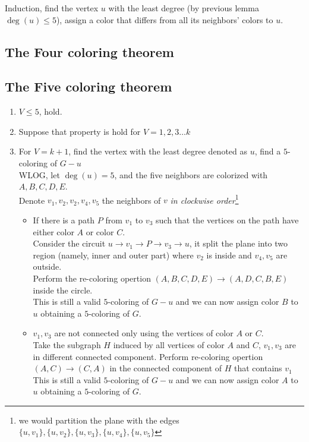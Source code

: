 \documentclass{article}
\begin{document}
Induction, find the vertex $u$ with the least degree (by previous lemma $\deg(u)\leq 5$), assign a color that differs from all its neighbors' colors to $u$.

\subsection{The Four coloring theorem}


\subsection{The Five coloring theorem}

\begin{enumerate}
	\item $V\leq 5$, hold.
	\item Suppose that property is hold for $V=1,2,3\ldots k$
	\item For $V=k+1$, find the vertex with the least degree denoted as $u$, find a $5$-coloring of $G-u$\\
	      WLOG, let $\deg(u)=5$, and the five neighbors are colorized with $A,B,C,D,E$.\\
	      Denote $v_1,v_2,v_2,v_4,v_5$ the neighbors of $v$ \emph{in clockwise order}\footnote{we would partition the plane with the edges $\{u,v_1\},\{u,v_2\},\{u,v_3\},\{u,v_4\},\{u,v_5\}$}\\
		\begin{itemize}
			\item If there is a path $P$ from $v_1$ to $v_3$ such that the vertices on the path have either color $A$ or color $C$.\\
				Consider the circuit $u\to v_1\to P\to v_3\to u$, it split the plane into two region (namely, inner and outer part) where $v_2$ is inside and $v_4,v_5$ are outside.\\
				Perform the re-coloring opertion $(A,B,C,D,E)\to (A,D,C,B,E)$ inside the circle.\\
				This is still a valid $5$-coloring of $G-u$ and we can now assign color $B$ to $u$ obtaining a $5$-coloring of $G$.
			\item $v_1,v_3$ are not connected only using the vertices of color $A$ or $C$.\\
				Take the subgraph $H$ induced by all vertices of color $A$ and $C$, $v_1,v_3$ are in different connected component. Perform re-coloring opertion $(A,C)\to (C,A)$ in the connected component of $H$ that contains $v_1$\\
				This is still a valid $5$-coloring of $G-u$ and we can now assign color $A$ to $u$ obtaining a $5$-coloring of $G$.
		\end{itemize}
\end{enumerate}
\end{document}
